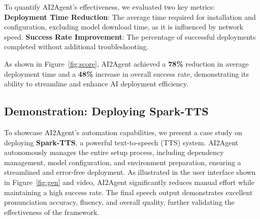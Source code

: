 To quantify AI2Agent’s effectiveness, we evaluated two key metrics:
\textbf{Deployment Time Reduction}: The average time required for installation and configuration, excluding model download time, as it is influenced by network speed.
\textbf{Success Rate Improvement}: The percentage of successful deployments completed without additional troubleshooting.


As shown in Figure~\ref{fig:score}, AI2Agent achieved a \textbf{78\%} reduction in average deployment time and a \textbf{48\%} increase in overall success rate, demonstrating its ability to streamline and enhance AI deployment efficiency.

\subsection{Demonstration: Deploying Spark-TTS}
To showcase AI2Agent’s automation capabilities, we present a case study on deploying \textbf{Spark-TTS}, a powerful text-to-speech (TTS) system. AI2Agent autonomously manages the entire setup process, including dependency management, model configuration, and environment preparation, ensuring a streamlined and error-free deployment. As illustrated in the user interface shown in Figure~\ref{fig:gen} and video\href{https://github.com/Avdpro/ai2apps}, AI2Agent significantly reduces manual effort while maintaining a high success rate. The final speech output demonstrates excellent pronunciation accuracy, fluency, and overall quality, further validating the effectiveness of the framework.